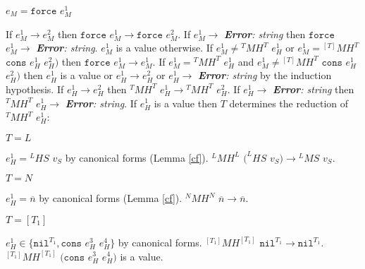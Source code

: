 \begin{case}

$e_{M}=\mathtt{force}$ $e_{M}^{1}$

If $e_{M}^{1}\rightarrow e_{M}^{2}$ then $\mathtt{force}$ $e_{M}^{1}\rightarrow\mathtt{force}$ $e_{M}^{2}$.  If $e_{M}^{1}\rightarrow$ \emph{\textbf{Error}: string} then $\mathtt{force}$ $e_{M}^{1}\rightarrow$ \emph{\textbf{Error}: string}.  $e_{M}^{1}$ is a value otherwise.  If $e_{M}^{1}\neq{^{T}M}H^{T}$ $e_{H}^{1}$ or $e_{M}^{1}={^{[T]}M}H^{T}$ $\mathtt{cons}$ $e_{H}^{1}$ $e_{H}^{2})$ then $\mathtt{force}$ $e_{M}^{1}\rightarrow e_{M}^{1}$.  If $e_{M}^{1}={^{T}M}H^{T}$ $e_{H}^{1}$ and $e_{M}^{1}\neq{^{[T]}M}H^{T}$ $\mathtt{cons}$ $e_{H}^{1}$ $e_{H}^{2})$ then $e_{H}^{1}$ is a value or $e_{H}^{1}\rightarrow e_{H}^{2}$ or $e_{H}^{1}\rightarrow$ \emph{\textbf{Error}: string} by the induction hypothesis.  If $e_{H}^{1}\rightarrow e_{H}^{2}$ then $^{T}MH^{T}$ $e_{H}^{1}\rightarrow{^{T}M}H^{T}$ $e_{H}^{2}$.  If $e_{H}^{1}\rightarrow$ \emph{\textbf{Error}: string} then $^{T}MH^{T}$ $e_{H}^{1}\rightarrow$ \emph{\textbf{Error}: string}.  If $e_{H}^{1}$ is a value then $T$ determines the reduction of $^{T}MH^{T}$ $e_{H}^{1}$:

\begin{subcase}

$T=L$

$e_{H}^{1}={^{L}H}S$ $v_{S}$ by canonical forms (Lemma \ref{cf}).  $^{L}MH^{L}$ $(^{L}HS$ $v_{S})\rightarrow{^{L}M}S$ $v_{S}$.

\end{subcase}

\begin{subcase}

$T=N$

$e_{H}^{1}=\overline{n}$ by canonical forms (Lemma \ref{cf}).  $^{N}MH^{N}$ $\overline{n}\rightarrow\overline{n}$.

\end{subcase}

\begin{subcase}

$T=[T_{1}]$

$e_{H}^{1}\in\lbrace\mathtt{nil}^{T_{1}},\mathtt{cons}$ $e_{H}^{3}$ $e_{H}^{4}\rbrace$ by canonical forms.  $^{[T_{1}]}MH^{[T_{1}]}$ $\mathtt{nil}^{T_{1}}\rightarrow\mathtt{nil}^{T_{1}}$.  $^{[T_{1}]}MH^{[T_{1}]}$ $(\mathtt{cons}$ $e_{H}^{3}$ $e_{H}^{4})$ is a value.

\end{subcase}


\end{case}
